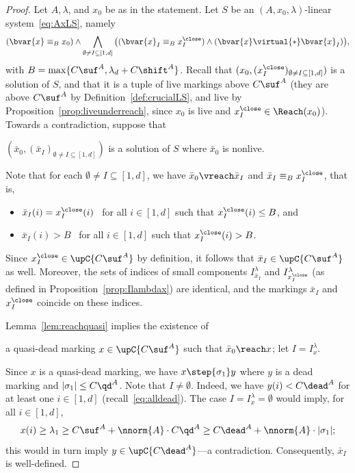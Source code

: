 \begin{proof}
	Let $A,\lambda$, and $x_0$ be as in the statement.
	Let $S$ be an $(A,x_0,\lambda)$-linear
	system~\eqref{eq:AxLS}, namely
\begin{equation*}
	(\bvar{x}\equiv_B x_0)
	\land
	\bigwedge_{\emptyset\neq I\subseteq[1,d]}\big((\bvar{x}_I\equiv_B x^\close_I)\land
	(\bvar{x}\virtual{*}\bvar{x}_I)\big),
\end{equation*}
with $B=\max\{C\suf^A,\lambda_d+C\shift^A\}$.
Recall that $({x}_0,({x}_I^\close)_{\emptyset\neq I\subseteq[1,d]})$ is a
solution of $S$, and that it is a tuple of live markings above
$C\suf^A$ (they are above $C\suf^A$ by
Definition~\ref{def:crucialLS}, and live by
Proposition~\ref{prop:liveunderreach}, since $x_0$ is live and
${x}_I^\close\in\Reach(x_0)$).
Towards a contradiction, suppose that
	\begin{center}
$(\bar{x}_0,(\bar{x}_I)_{\emptyset\neq I\subseteq[1,d]})$ is a solution of $S$
where $\bar{x}_0$ is nonlive. 
	\end{center}
	Note that for each $\emptyset\neq I\subseteq[1,d]$, we have
	$\bar{x}_0\vreach \bar{x}_I$ and
	$\bar{x}_I\equiv_B
	x^\close_I$, that is, 
	\begin{itemize}
		\item			
			$\bar{x}_I(i)=x^\close_I(i)$ \ for all
			$i\in[1,d]$ such that $x^\close_I(i)\leq B$, and
\item
			$\bar{x}_I(i)>B$ \ for all
			$i\in[1,d]$ such that $x^\close_I(i)>B$.
	\end{itemize}			
Since $x^\close_I\in\upC{C\suf^A}$ by definition, it follows that 
	$\bar{x}_I\in\upC{C\suf^A}$ as well.
	Moreover, the sets of indices of small components 
	$I^\lambda_{\bar{x}_I}$ and $I^\lambda_{x^\close_I}$
	(as defined in	Proposition~\ref{prop:Ilambdax}) are
	identical,
	and the markings $\bar{x}_I$ and $x^\close_I$ coincide on
	these indices.

\smallskip

	Lemma~\ref{lem:reachquasi} implies the existence of
	\begin{center}
	a quasi-dead
		marking $x\in\upC{C\suf^A}$ 
		such that 
	$\bar{x}_0\reach x$; let
 $I=I^\lambda_{x}$. 
	\end{center}		
Since $x$ is a quasi-dead marking, we have $x\step{\sigma_1}y$ where
$y$ is a dead marking and
	$|\sigma_1|\leq C\qd^A$.  
	Note that $I\neq\emptyset$. Indeed, we have $y(i)< C\dead^A$
	for at least one $i\in[1,d]$ (recall~\eqref{eq:alldead}).
The case $I=I^\lambda_{x}=\emptyset$ would imply,	 for all
	$i\in[1,d]$,
	\[x(i)\geq
	\lambda_1\geq C\suf^A+\nnorm{A}\cdot
	C\qd^A\geq 
	C\dead^A+\nnorm{A}\cdot |\sigma_1|;\]
this would in turn imply $y\in\upC{C\dead^A}$---a contradiction.  
Consequently, $\bar{x}_{I}$ is well-defined.


\end{proof}
